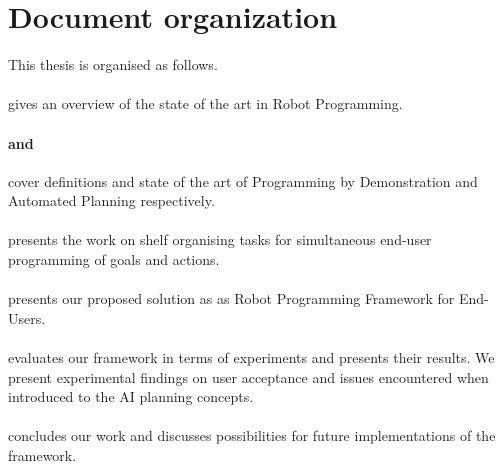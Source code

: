 \section{Document organization}
This thesis is organised as follows. 

\paragraph{} gives an overview of the state of the art in Robot Programming.

\paragraph{ and } cover definitions and state of the art of Programming by Demonstration and Automated Planning respectively.

\paragraph{} presents the work on shelf organising tasks for simultaneous end-user programming of goals and actions.

\paragraph{} presents our proposed solution as as Robot Programming Framework for End-Users.


\paragraph{} evaluates our framework in terms of experiments and presents their results. We present experimental findings on user acceptance and issues encountered when introduced to the AI planning concepts.

\paragraph{} concludes our work and discusses possibilities for future implementations of the framework.
